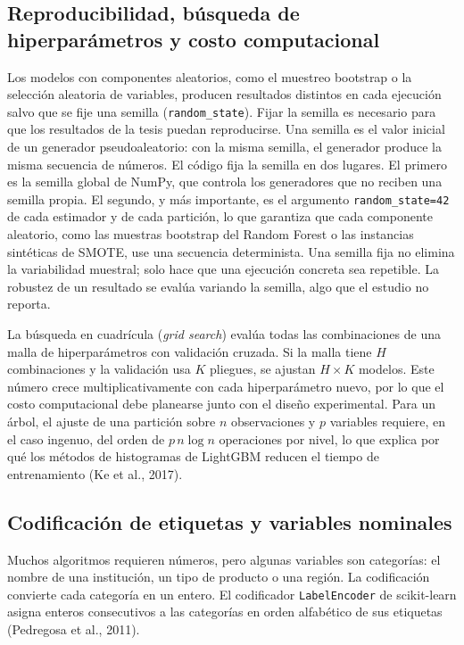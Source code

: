 \subsection{Reproducibilidad, búsqueda de hiperparámetros y costo computacional}
Los modelos con componentes aleatorios, como el muestreo bootstrap o la selección aleatoria de variables, producen resultados distintos en cada ejecución salvo que se fije una semilla (\texttt{random\_state}). Fijar la semilla es necesario para que los resultados de la tesis puedan reproducirse. Una semilla es el valor inicial de un generador pseudoaleatorio: con la misma semilla, el generador produce la misma secuencia de números. El código fija la semilla en dos lugares. El primero es la semilla global de NumPy, que controla los generadores que no reciben una semilla propia. El segundo, y más importante, es el argumento \texttt{random\_state=42} de cada estimador y de cada partición, lo que garantiza que cada componente aleatorio, como las muestras bootstrap del Random Forest o las instancias sintéticas de SMOTE, use una secuencia determinista. Una semilla fija no elimina la variabilidad muestral; solo hace que una ejecución concreta sea repetible. La robustez de un resultado se evalúa variando la semilla, algo que el estudio no reporta.

La búsqueda en cuadrícula (\textit{grid search}) evalúa todas las combinaciones de una malla de hiperparámetros con validación cruzada. Si la malla tiene $H$ combinaciones y la validación usa $K$ pliegues, se ajustan $H\times K$ modelos. Este número crece multiplicativamente con cada hiperparámetro nuevo, por lo que el costo computacional debe planearse junto con el diseño experimental. Para un árbol, el ajuste de una partición sobre $n$ observaciones y $p$ variables requiere, en el caso ingenuo, del orden de $p\,n\log n$ operaciones por nivel, lo que explica por qué los métodos de histogramas de LightGBM reducen el tiempo de entrenamiento (Ke et al., 2017).

\subsection{Codificación de etiquetas y variables nominales}
Muchos algoritmos requieren números, pero algunas variables son categorías: el nombre de una institución, un tipo de producto o una región. La codificación convierte cada categoría en un entero. El codificador \texttt{LabelEncoder} de scikit-learn asigna enteros consecutivos a las categorías en orden alfabético de sus etiquetas (Pedregosa et al., 2011).

